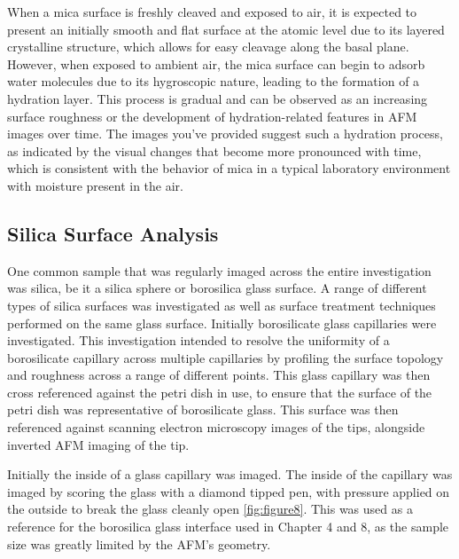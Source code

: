 When a mica surface is freshly cleaved and exposed to air, it is expected to present an initially smooth and flat surface at the atomic level due to its layered crystalline structure, which allows for easy cleavage along the basal plane. However, when exposed to ambient air, the mica surface can begin to adsorb water molecules due to its hygroscopic nature, leading to the formation of a hydration layer. This process is gradual and can be observed as an increasing surface roughness or the development of hydration-related features in AFM images over time. The images you've provided suggest such a hydration process, as indicated by the visual changes that become more pronounced with time, which is consistent with the behavior of mica in a typical laboratory environment with moisture present in the air. \cite{MicaSurf, MicaHgryo, Koishi2022WaterAdsorption}

\subsection{Silica Surface Analysis}

 One common sample that was regularly imaged across the entire investigation was silica, be it a silica sphere or borosilica glass surface. A range of different types of silica surfaces was investigated as well as surface treatment techniques performed on the same glass surface. Initially borosilicate glass capillaries were investigated. This investigation intended to resolve the uniformity of a borosilicate capillary across multiple capillaries by profiling the surface topology and roughness across a range of different points. This glass capillary was then cross referenced against the petri dish in use, to ensure that the surface of the petri dish was representative of borosilicate glass. This surface was then referenced against scanning electron microscopy images of the tips, alongside inverted AFM imaging of the tip.

Initially the inside of a glass capillary was imaged. The inside of the capillary was imaged by scoring the glass with a diamond tipped pen, with pressure applied on the outside to break the glass cleanly open \ref{fig:figure8}. This was used as a reference for the borosilica glass interface used in Chapter 4 and 8, as the sample size was greatly limited by the AFM's geometry.

